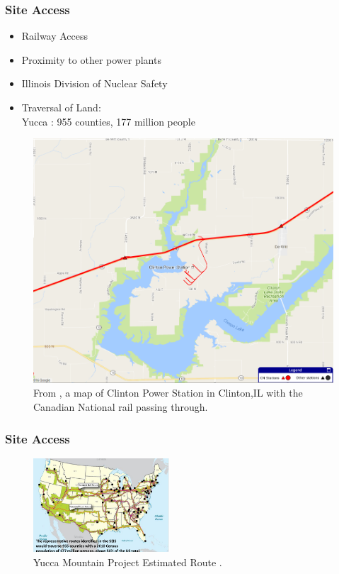 \begin{frame}
	\frametitle{Site Access}
	\begin{itemize}
		\item Railway Access
		\item Proximity to other power plants
		\item Illinois Division of Nuclear Safety
		\item Traversal of Land:\\Yucca : 955 counties, 177 million people \cite{halstead_yucca_2011}
	\end{itemize}
	\begin{figure}[!h] 
		\centering
		\includegraphics[width=0.4\columnwidth]{./images/cnmap.png}	
		\caption{From \cite{canadian_national_railway_company_canadian_2016}, a map of Clinton Power Station in Clinton,IL
			with the Canadian National rail passing through.}
		\label{fig:cnmap}
	\end{figure}
\end{frame}

\begin{frame}
	\frametitle{Site Access}
	
	\begin{figure}[htbp!]
		\begin{center}
			\includegraphics[height=3.5cm]{./images/yucca_route.png}
		\end{center}
		\caption{Yucca Mountain Project Estimated Route \cite{halstead_yucca_2011}.}
		\label{fig:yucca_route}
	\end{figure}
	\begin{table}[h]
		\centering
		\caption {Site Access for Each Case}
	\end{table}
\end{frame}



